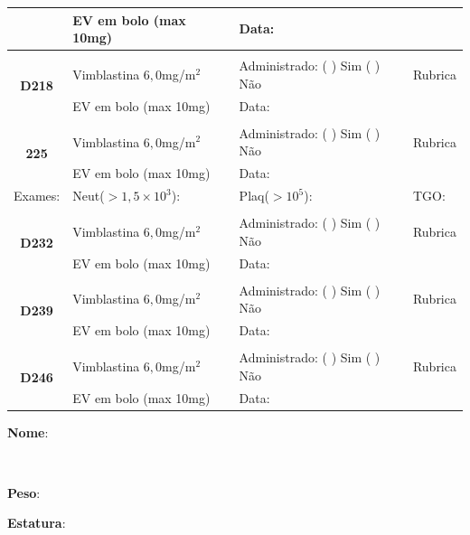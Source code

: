 \documentclass[11pt,a4paper,oldfontcommands]{memoir}
\def\entrywithlabel[#1]#2{\parbox{#1}{{\small #2:} \hrulefill}}
\begin{document}
\begin{center}
\begin{table}[H]
\begin{tabular}{p{}p{}|p{}|p{3cm}}
    \multicolumn{1}{c|}{}&{EV em bolo (max 10mg)}&{Data:}&\\
    \hline
   \\
    \hline
    \multicolumn{1}{c|}{\multirow{2}{*}{\textbf{D218}}}&{Vimblastina \(6,0\)mg/m\(^2\)}&{Administrado: (  ) Sim (  ) Não}&{Rubrica}\\
    \multicolumn{1}{c|}{}&{EV em bolo (max 10mg)}&{Data:}&\\
    \hline
    \\
    \hline
    \multicolumn{1}{c|}{\multirow{2}{*}{\textbf{225}}}&{Vimblastina \(6,0\)mg/m\(^2\)}&{Administrado: (  ) Sim (  ) Não}&{Rubrica}\\
    \multicolumn{1}{c|}{}&{EV em bolo (max 10mg)}&{Data:}&\\
    \hline
    {Exames:}&{Neut(\(>1,5\times10^3\)):}&{Plaq(\(>10^5\)):}&{TGO:}
    \\
    \hline
    \\
    \hline
    \multicolumn{1}{c|}{\multirow{2}{*}{\textbf{D232}}}&{Vimblastina \(6,0\)mg/m\(^2\)}&{Administrado: (  ) Sim (  ) Não}&{Rubrica}\\
    \multicolumn{1}{c|}{}&{EV em bolo (max 10mg)}&{Data:}&\\
    \hline
    \\
    \hline
    \multicolumn{1}{c|}{\multirow{2}{*}{\textbf{D239}}}&{Vimblastina \(6,0\)mg/m\(^2\)}&{Administrado: (  ) Sim (  ) Não}&{Rubrica}\\
    \multicolumn{1}{c|}{}&{EV em bolo (max 10mg)}&{Data:}&\\
    \hline
    \\
    \hline
    \multicolumn{1}{c|}{\multirow{2}{*}{\textbf{D246}}}&{Vimblastina \(6,0\)mg/m\(^2\)}&{Administrado: (  ) Sim (  ) Não}&{Rubrica}\\
    \multicolumn{1}{c|}{}&{EV em bolo (max 10mg)}&{Data:}&\\
    \hline
    
\end{tabular}
\end{table}

\noindent
\entrywithlabel[1\hsize]{\textbf{Nome}}\hfill
\\[0.3cm]
\entrywithlabel[.45\hsize]{\textbf{Peso}}\hfill  \entrywithlabel[.45\hsize]{\textbf{Estatura}}



\end{center}
\end{document}

